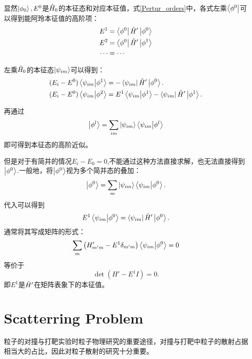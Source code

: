 显然$\left|\phi_0\right>,E^0$是$\hat{H}_0$的本征态和对应本征值，式\ref{Pertur_orders}中，各式左乘$\left<\phi^0\right|$可以得到能阿玲本征值的高阶项：
\begin{equation}
    \begin{aligned}
    E^1&=\left<\phi^0\right|\hat{H}'\left|\phi^0\right>\\
    E^2&=\left<\phi^0\right|\hat{H}'\left|\phi^1\right>\\
    \cdots&=\cdots
    \end{aligned}
\end{equation}

左乘$\hat{H}_0$的本征态$\left|\psi_{im}\right>$可以得到：
\begin{equation}
    \begin{aligned}
        (E_i-E^0)\left<\psi_{im}\middle|\phi^1\right>&=-\left<\psi_{im}\right|\hat{H}'\left|\phi^0\right>.\\
        (E_i-E^0)\left<\psi_{im}\middle|\phi^2\right>&=E^1\left<\psi_{im}\middle|\phi^1\right>-\left<\psi_{im}\right|\hat{H}'\left|\phi^1\right>.
    \end{aligned}
\end{equation}

再通过
\begin{equation}
    \left|\phi^l\right>=\sum_{im}\left|\psi_{im}\right>\left<\psi_{im}\middle|\phi^l\right>
\end{equation}
即可得到本征态的高阶近似。

但是对于有简并的情况$E_i-E_0=0$,不能通过这种方法直接求解，也无法直接得到$\left|\phi^0\right>$.一般地，将$\left|\phi^0\right>$视为多个简并态的叠加：
\begin{equation}
    \left|\phi^0\right>=\sum_{m}\left|\psi_{im}\right>\left<\psi_{im}\middle|\phi^0\right>.
\end{equation}
代入可以得到
\begin{equation}
    E^1\left<\psi_{im}\middle|\phi^0\right>=\left<\psi_{im}\right|\hat{H}'\left|\phi^0\right>.
\end{equation}
通常将其写成矩阵的形式：
\begin{equation}
    \sum_m\left(H'_{m'm}-E^1\delta_{m'm}\right)\left<\psi_{im}\middle|\phi^0\right>=0
\end{equation}
等价于
\begin{equation}
    \det\left(H'-E^1I\right)=0.
\end{equation}
即$E^1$是$\hat{H}'$在矩阵表象下的本征值。

\section{Scatterring Problem}
粒子的对撞与打靶实验时粒子物理研究的重要途径，对撞与打靶中粒子的散射占据相当大的占比，因此对粒子散射的研究十分重要。

